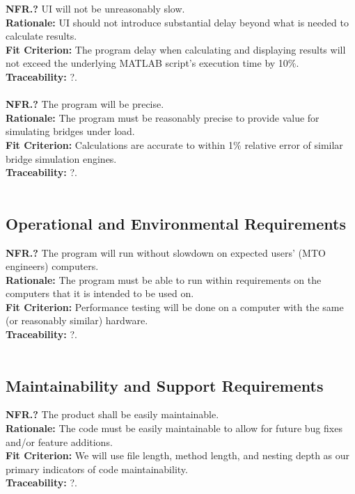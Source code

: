 \documentclass[12pt]{article}
\begin{document}
  \textbf{NFR.?} UI will not be unreasonably slow.\\
  \textbf{Rationale:} UI should not introduce substantial delay beyond what is needed to calculate results.\\
  \textbf{Fit Criterion:} The program delay when calculating and displaying results will not exceed the underlying MATLAB script's execution time by 10\%.\\
  \textbf{Traceability:} ?.\\\\

  \textbf{NFR.?} The program will be precise.\\
  \textbf{Rationale:} The program must be reasonably precise to provide value for simulating bridges under load.\\
  \textbf{Fit Criterion:} Calculations are accurate to within 1\% relative error of similar bridge simulation engines.\\
  \textbf{Traceability:} ?.\\\\

\subsection{Operational and Environmental Requirements}

  \textbf{NFR.?} The program will run without slowdown on expected users' (MTO engineers) computers.\\
  \textbf{Rationale:} The program must be able to run within requirements on the computers that it is intended to be used on.\\
  \textbf{Fit Criterion:} Performance testing will be done on a computer with the same (or reasonably similar) hardware.\\
  \textbf{Traceability:} ?.\\\\

\subsection{Maintainability and Support Requirements}

  \textbf{NFR.?} The product shall be easily maintainable.\\
  \textbf{Rationale:} The code must be easily maintainable to allow for future bug fixes and/or feature additions.\\
  \textbf{Fit Criterion:} We will use file length, method length, and nesting depth as our primary indicators of code maintainability.\\
  \textbf{Traceability:} ?.\\\\
\end{document}
